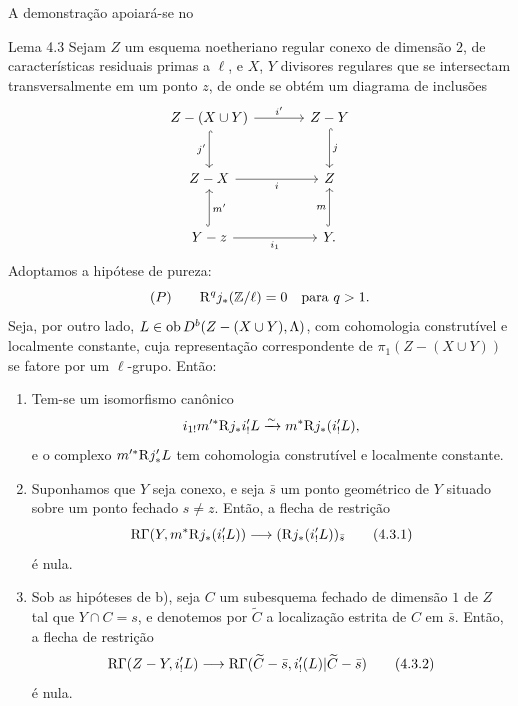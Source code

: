 A demonstração apoiará-se no

\begin{statement}{Lema 4.3}
Sejam $Z$ um esquema noetheriano regular conexo de dimensão $2$, de características residuais primas a $\ell$, e $X$, $Y$ divisores regulares que se intersectam transversalmente em um ponto $z$, de onde se obtém um diagrama de inclusões
\[
\begin{tikzcd}[column sep=large,row sep=large]
Z-(X\cup Y) \arrow[r,"i'"] \arrow[d,hook,"j'"'] & Z-Y \arrow[d,hook,"j"]\\
Z-X \arrow[r,"i"'] & Z\\
Y-z \arrow[r,"i_1"'] \arrow[u,hook,"m'"'] & Y \arrow[u,hook,"m"] .
\end{tikzcd}
\]
Adoptamos a hipótese de pureza:
\[
(P)\qquad \mathrm{R}^qj_*(\mathbb Z/\ell)=0\quad\text{para }q>1.
\]
Seja, por outro lado, $L\in\operatorname{ob} D^b(Z-(X\cup Y),\Lambda)$, com cohomologia construtível e localmente constante, cuja representação correspondente de $\pi_1(Z-(X\cup Y))$ se fatore por um $\ell$-grupo. Então:
\begin{enumerate}[label=\alph*)]
\item Tem-se um isomorfismo canônico
\[
i_{1!}m'^*\mathrm{R} j_*i'_!L\xrightarrow{\sim} m^*\mathrm{R} j_*(i'_!L),
\]
e o complexo $m'^*\mathrm{R} j'_*L$ tem cohomologia construtível e localmente constante.
\item Suponhamos que $Y$ seja conexo, e seja $\bar s$ um ponto geométrico de $Y$ situado sobre um ponto fechado $s\ne z$. Então, a flecha de restrição
\begin{equation}
\mathrm{R}\Gamma(Y,m^*\mathrm{R} j_*(i'_!L))\longrightarrow (\mathrm{R} j_*(i'_!L))_{\bar s}
\tag{4.3.1}
\end{equation}
é nula.
\item Sob as hipóteses de b), seja $C$ um subesquema fechado de dimensão $1$ de $Z$ tal que $Y\cap C=s$, e denotemos por $\widetilde C$ a localização estrita de $C$ em $\bar s$. Então, a flecha de restrição
\begin{equation}
\mathrm{R}\Gamma(Z-Y,i'_!L)
\longrightarrow
\mathrm{R}\Gamma(\widetilde C-\bar s,i'_!(L)|\widetilde C-\bar s)
\tag{4.3.2}
\end{equation}
é nula.
\end{enumerate}
\end{statement}
